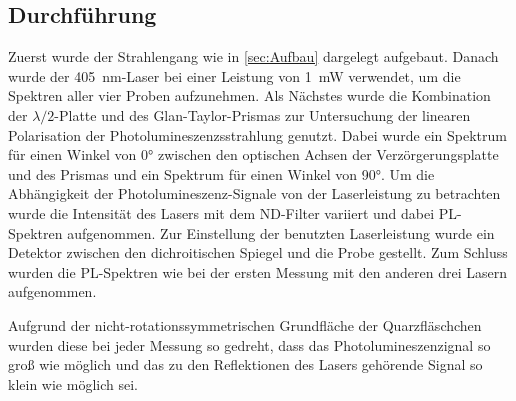     
\subsection{Durchführung}
\label{sec:Durchfuehrung}
    Zuerst wurde der Strahlengang wie in \autoref{sec:Aufbau} dargelegt aufgebaut.
    Danach wurde der \qty{405}{nm}-Laser bei einer Leistung von \qty{1}{mW} verwendet, um die Spektren aller vier Proben aufzunehmen.
    Als Nächstes wurde die Kombination der $\lambda/2$-Platte und des Glan-Taylor-Prismas zur Untersuchung der linearen Polarisation der Photolumineszenzsstrahlung genutzt.
    Dabei wurde ein Spektrum für einen Winkel von 0° zwischen den optischen Achsen der Verzörgerungsplatte und des Prismas und ein Spektrum für einen Winkel von 90°.
    Um die Abhängigkeit der Photolumineszenz-Signale von der Laserleistung zu betrachten wurde die Intensität des Lasers mit dem ND-Filter variiert und dabei PL-Spektren aufgenommen.
    Zur Einstellung der benutzten Laserleistung wurde ein Detektor zwischen den dichroitischen Spiegel und die Probe gestellt.
    Zum Schluss wurden die PL-Spektren wie bei der ersten Messung mit den anderen drei Lasern aufgenommen.

    Aufgrund der nicht-rotationssymmetrischen Grundfläche der Quarzfläschchen wurden diese bei jeder Messung so gedreht, dass das Photolumineszenzignal so groß wie möglich und das zu den Reflektionen des Lasers gehörende Signal so klein wie möglich sei.
